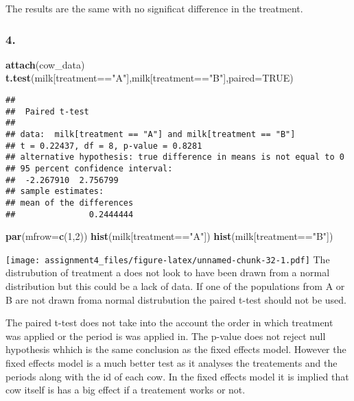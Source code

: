 \documentclass[11pt,]{article}
\newenvironment{Shaded}{\begin{snugshade}}{\end{snugshade}}
\newcommand{\KeywordTok}[1]{\textcolor[rgb]{0.13,0.29,0.53}{\textbf{{#1}}}}
\newcommand{\DataTypeTok}[1]{\textcolor[rgb]{0.13,0.29,0.53}{{#1}}}
\newcommand{\DecValTok}[1]{\textcolor[rgb]{0.00,0.00,0.81}{{#1}}}
\newcommand{\StringTok}[1]{\textcolor[rgb]{0.31,0.60,0.02}{{#1}}}
\newcommand{\OtherTok}[1]{\textcolor[rgb]{0.56,0.35,0.01}{{#1}}}
\newcommand{\NormalTok}[1]{{#1}}
\begin{document}
The results are the same with no significat difference in the treatment.

\subsubsection{4.}\label{section-19}

\begin{Shaded}
\begin{Highlighting}[]
\KeywordTok{attach}\NormalTok{(cow_data)}
\KeywordTok{t.test}\NormalTok{(milk[treatment==}\StringTok{"A"}\NormalTok{],milk[treatment==}\StringTok{"B"}\NormalTok{],}\DataTypeTok{paired=}\OtherTok{TRUE}\NormalTok{)}
\end{Highlighting}
\end{Shaded}

\begin{verbatim}
## 
##  Paired t-test
## 
## data:  milk[treatment == "A"] and milk[treatment == "B"]
## t = 0.22437, df = 8, p-value = 0.8281
## alternative hypothesis: true difference in means is not equal to 0
## 95 percent confidence interval:
##  -2.267910  2.756799
## sample estimates:
## mean of the differences 
##               0.2444444
\end{verbatim}

\begin{Shaded}
\begin{Highlighting}[]
\KeywordTok{par}\NormalTok{(}\DataTypeTok{mfrow=}\KeywordTok{c}\NormalTok{(}\DecValTok{1}\NormalTok{,}\DecValTok{2}\NormalTok{))}
\KeywordTok{hist}\NormalTok{(milk[treatment==}\StringTok{"A"}\NormalTok{])}
\KeywordTok{hist}\NormalTok{(milk[treatment==}\StringTok{"B"}\NormalTok{])}
\end{Highlighting}
\end{Shaded}

\texttt{[image: assignment4\_files/figure-latex/unnamed-chunk-32-1.pdf]}
The distrubution of treatment a does not look to have been drawn from a
normal distribution but this could be a lack of data. If one of the
populations from A or B are not drawn froma normal distrubution the
paired t-test should not be used.

The paired t-test does not take into the account the order in which
treatment was applied or the period is was applied in. The p-value does
not reject null hypothesis whhich is the same conclusion as the fixed
effects model. However the fixed effects model is a much better test as
it analyses the treatements and the periods along with the id of each
cow. In the fixed effects model it is implied that cow itself is has a
big effect if a treatement works or not.
\end{document}
